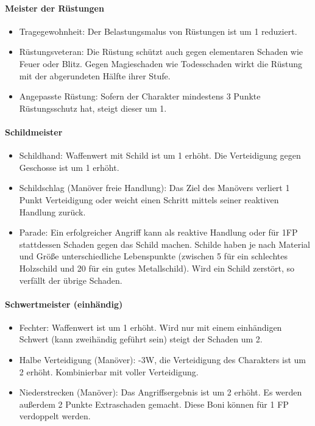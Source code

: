 \documentclass{article}
\begin{document}
\paragraph{Meister der Rüstungen}

\begin{itemize}
\item Tragegewohnheit: Der Belastungsmalus von Rüstungen ist um 1 reduziert.
\item Rüstungsveteran: Die Rüstung schützt auch gegen elementaren Schaden wie Feuer oder Blitz. Gegen Magieschaden wie Todesschaden wirkt die Rüstung mit der abgerundeten Hälfte ihrer Stufe.
\item Angepasste Rüstung: Sofern der Charakter mindestens 3 Punkte Rüstungsschutz hat, steigt dieser um 1.
\end{itemize}

\paragraph{Schildmeister}

\begin{itemize}
\item Schildhand: Waffenwert mit Schild ist um 1 erhöht. Die Verteidigung gegen Geschosse ist um 1 erhöht.
\item Schildschlag (Manöver freie Handlung): Das Ziel des Manövers verliert 1 Punkt Verteidigung oder weicht einen Schritt mittels seiner reaktiven Handlung zurück.
\item Parade: Ein erfolgreicher Angriff kann als reaktive Handlung oder für 1FP stattdessen Schaden gegen das Schild machen. Schilde haben je nach Material und Größe unterschiedliche Lebenspunkte (zwischen 5 für ein schlechtes Holzschild und 20 für ein gutes Metallschild). Wird ein Schild zerstört, so verfällt der übrige Schaden.
\end{itemize}

\paragraph{Schwertmeister (einhändig)}

\begin{itemize}
\item Fechter: Waffenwert ist um 1 erhöht. Wird nur mit einem einhändigen Schwert (kann zweihändig geführt sein) steigt der Schaden um 2.
\item Halbe Verteidigung (Manöver): -3W, die Verteidigung des Charakters ist um 2 erhöht. Kombinierbar mit voller Verteidigung.
\item Niederstrecken (Manöver): Das Angriffsergebnis ist um 2 erhöht. Es werden außerdem 2 Punkte Extraschaden gemacht. Diese Boni können für 1 FP verdoppelt werden.
\end{itemize}
\end{document}
